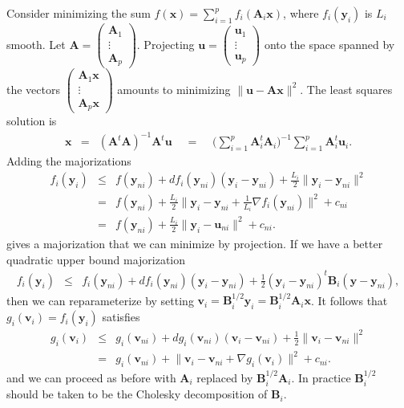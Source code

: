 \documentclass[11pt]{article}
\def\amp{\mathop{\;\:}\nolimits}
\newcommand{\bu}{\boldsymbol{u}}
\newcommand{\bv}{\boldsymbol{v}}
\newcommand{\bx}{\boldsymbol{x}}
\newcommand{\by}{\boldsymbol{y}}
\newcommand{\bA}{\boldsymbol{A}}
\newcommand{\bB}{\boldsymbol{B}}
\begin{document}
Consider minimizing the sum $f(\bx)=\sum_{i=1}^p f_i(\bA_i\bx)$, 
where $f_i(\by_i)$ is $L_i$ smooth. Let $\bA=\begin{pmatrix}\bA_1 \\ \vdots \\ \bA_p \end{pmatrix}$. Projecting $\bu = \begin{pmatrix} \bu_1 \\ \vdots \\ \bu_p \end{pmatrix}$ onto the space spanned by the vectors 
$\begin{pmatrix}\bA_1\bx \\ \vdots \\ \bA_p\bx \end{pmatrix}$
amounts to minimizing $\|\bu-\bA\bx\|^2$. The least squares solution is
\begin{eqnarray*}
\bx & = & (\bA^t\bA)^{-1}\bA^t\bu 
\amp = \amp \Big(\sum_{i=1}^p \bA_i^t \bA_i \Big)^{-1}
\sum_{i=1}^p \bA_i^t \bu_i.
\end{eqnarray*}
Adding the majorizations
\begin{eqnarray*}
f_i(\by_i) & \le & f(\by_{ni})+df_i(\by_{ni})(\by_i-\by_{ni})
+\frac{L_i}{2}\|\by_i-\by_{ni}\|^2 \\
& = & f(\by_{ni}) +\frac{L_i}{2}\Big\|\by_i-\by_{ni}+\frac{1}{L_i}\nabla f_i(\by_{ni})\Big\|^2 
+c_{ni} \\
& = & f(\by_{ni}) +\frac{L_i}{2}\Big\|\by_i-\bu_{ni}\Big\|^2 
+c_{ni}.
\end{eqnarray*}
gives a majorization that we can minimize by projection.
If we have a better quadratic upper bound majorization
\begin{eqnarray*}
f_i(\by_i) & \le & f_i(\by_{ni})+df_i(\by_{ni})(\by_i-\by_{ni})
+\frac{1}{2}(\by_i-\by_{ni})^t\bB_i(\by-\by_{ni}),
\end{eqnarray*}
then we can reparameterize by setting $\bv_i = \bB_i^{1/2}\by_i
=\bB_i^{1/2}\bA_i \bx$. It follows that $g_i(\bv_i)= f_i(\by_i)$ satisfies
\begin{eqnarray*}
g_i(\bv_i) & \le & g_i(\bv_{ni})+dg_i(\bv_{ni})(\bv_i-\bv_{ni})
+\frac{1}{2}\|\bv_i-\bv_{ni}\|^2 \\
& = & g_i(\bv_{ni})+\Big\|\bv_i-\bv_{ni}+\nabla g_i(\bv_i)\Big\|^2 + c_{ni}.
\end{eqnarray*}
and we can proceed as before with $\bA_i$ replaced by $\bB_i^{1/2}\bA_i$. In practice $\bB_i^{1/2}$ should be taken to be the Cholesky decomposition of $\bB_i$. 
\end{document}
